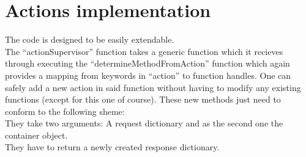 \section{Actions implementation}

The code is designed to be easily extendable.\\
The ``actionSupervisor'' function takes a generic function which it recieves through executing the ``determineMethodFromAction''
function which again provides a mapping from keywords in ``action'' to function handles. One can safely add a new action
in said function without having to modify any existing functions (except for this one of course). These new methods
just need to conform to the following sheme:\\
They take two arguments: A request dictionary and as the second one the container object.\\
They have to return a newly created response dictionary.